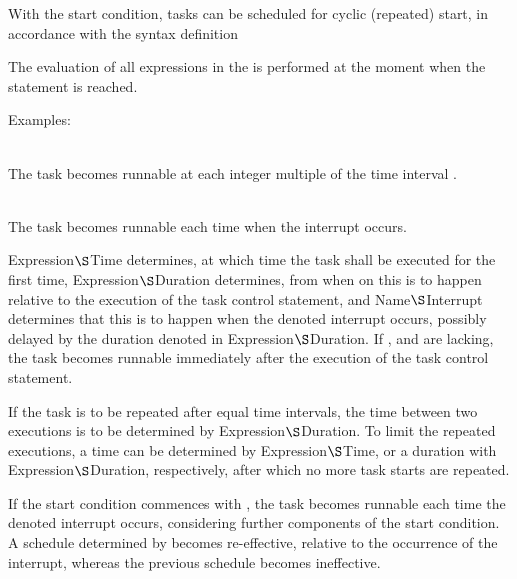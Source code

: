 With the start condition, tasks can be scheduled for cyclic (repeated)
start, in accordance with the syntax definition

\begin{grammarframe}

\end{grammarframe}

The evaluation of all expressions in the  is performed 
at the moment when the  statement is reached. 

Examples:

\\
The task  becomes runnable at each integer
multiple of the time interval .

\\
The task  becomes runnable each time when the
interrupt  occurs.

  
 Expression$\S $Time determines, at which time the task shall be
executed for the first time, 
 Expression$\S $Duration determines,
from when on this is to happen relative to the execution of the task
control statement, and  
 Name$\S $Interrupt determines that this is
to happen when the denoted interrupt occurs, possibly delayed by the
duration denoted in  Expression$\S $Duration.
 If ,  and  
are lacking, the task becomes runnable immediately after the execution
of the task control statement.

If the task is to be repeated after equal time intervals, the time between
two executions is to be determined by 
 Expression$\S $Duration. 
To limit the repeated executions, a time can be determined by 
 Expression$\S $Time, or 
a duration with
  Expression$\S $Duration,
respectively, after which no more task starts are repeated.

If the start condition commences with , the task becomes runnable
each time the denoted interrupt occurs, considering further components
of the start condition. A schedule determined by  becomes
re-effective, relative to the occurrence of the interrupt, whereas the
previous schedule becomes ineffective.

